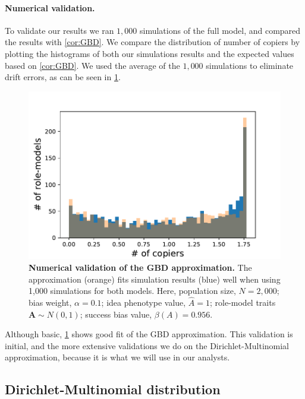 \documentclass[12pt]{extarticle}
\let\vec\mathbf
\begin{document}
\paragraph{Numerical validation.}
To validate our results we ran $1,000$ simulations of the full model, and compared the results with \cref{cor:GBD}.
We compare the distribution of number of copiers by plotting the histograms of both our simulations results and the expected values based on \cref{cor:GBD}.
We used the average of the $1,000$ simulations to eliminate drift errors, as can be seen in \cref{fig:GBD}.

\begin{figure}[h]
    \includegraphics[width=0.7\linewidth]{../figures/final/GBD_validation.pdf}
  \caption{
  \textbf{Numerical validation of the GBD approximation.}
  The approximation (orange) fits simulation results (blue) well when using 1,000 simulations for both models.
  Here, population size, $N=2,000$; bias weight, $\alpha=0.1$; idea phenotype value, $\hat{A}=1$; role-model traits $\vec{A} \sim N(0,1)$; success bias value, $\beta(A)=0.956$.}	
  \label{fig:GBD}
\end{figure}

Although basic, \cref{fig:GBD} shows good fit of the GBD approximation.
This validation is initial, and the more extensive validations we do on the Dirichlet-Multinomial approximation, because it is what we will use in our analysts.

\subsection{Dirichlet-Multinomial distribution}
\end{document}
